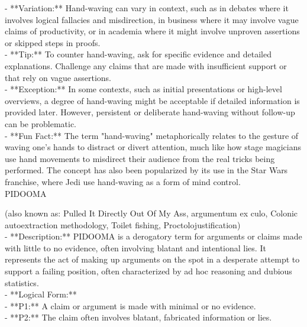 \documentclass[a4paper,12pt,single,pdftex]{scrartcl}
\begin{document}
    
      - **Variation:** Hand-waving can vary in context, such as in debates where it involves logical fallacies and misdirection, in business where it may involve vague claims of productivity, or in academia where it might involve unproven assertions or skipped steps in proofs.
    \\

    
      - **Tip:** To counter hand-waving, ask for specific evidence and detailed explanations. Challenge any claims that are made with insufficient support or that rely on vague assertions.
    \\

    
      - **Exception:** In some contexts, such as initial presentations or high-level overviews, a degree of hand-waving might be acceptable if detailed information is provided later. However, persistent or deliberate hand-waving without follow-up can be problematic.
    \\

    
      - **Fun Fact:** The term "hand-waving" metaphorically relates to the gesture of waving one’s hands to distract or divert attention, much like how stage magicians use hand movements to misdirect their audience from the real tricks being performed. The concept has also been popularized by its use in the Star Wars franchise, where Jedi use hand-waving as a form of mind control.
    \\

  

PIDOOMA
    
      (also known as:  Pulled It Directly Out Of My Ass, argumentum ex culo, Colonic autoextraction methodology, Toilet fishing, Proctolojustification)
    \\

  
    
      - **Description:** PIDOOMA is a derogatory term for arguments or claims made with little to no evidence, often involving blatant and intentional lies. It represents the act of making up arguments on the spot in a desperate attempt to support a failing position, often characterized by ad hoc reasoning and dubious statistics.
    \\

    
      - **Logical Form:**
    \\

    
        - **P1:** A claim or argument is made with minimal or no evidence.
    \\

    
        - **P2:** The claim often involves blatant, fabricated information or lies.
    \\
\end{document}
